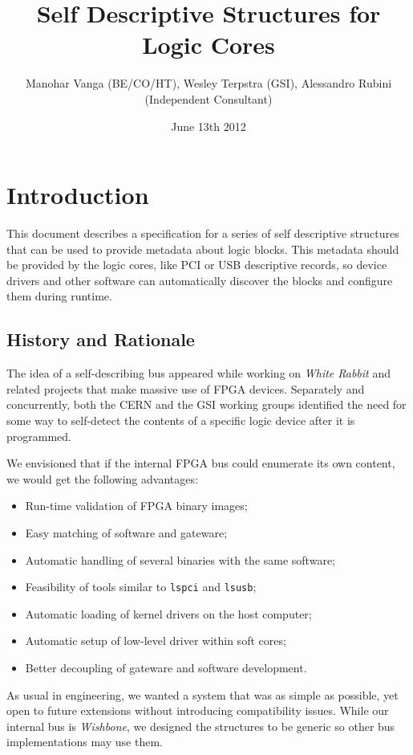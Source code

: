\documentclass[a4paper, 12pt]{article}
\title{Self Descriptive Structures for Logic Cores}
\author{Manohar Vanga (BE/CO/HT), Wesley Terpstra (GSI), Alessandro Rubini (Independent Consultant)}
\date{June 13th 2012}
\begin{document}
\maketitle

\tableofcontents
\listoftables
\listoffigures

\pagebreak

\section{Introduction}

This document describes a specification for a series of self descriptive
structures that can be used to provide metadata about logic blocks. This metadata
should be provided by the logic cores, like PCI or USB descriptive records,
so device drivers and other software can automatically discover the blocks and
configure them during runtime.

\subsection{History and Rationale}

The idea of a self-describing bus appeared while working on
\textit{White Rabbit} and related projects that make massive use of
FPGA devices. Separately and concurrently, both the CERN and the GSI
working groups identified the need for some way to self-detect the
contents of a specific logic device after it is programmed.

We envisioned that if the internal FPGA bus could enumerate its own
content, we would get the following advantages:

\begin{itemize}
\item Run-time validation of FPGA binary images;
\item Easy matching of software and gateware;
\item Automatic handling of several binaries with the same software;
\item Feasibility of tools similar to \texttt{lspci} and \texttt{lsusb};
\item Automatic loading of kernel drivers on the host computer;
\item Automatic setup of low-level driver within soft cores;
\item Better decoupling of gateware and software development.
\end{itemize}

As usual in engineering, we wanted a system that was as simple as possible,
yet open to future extensions without introducing compatibility issues.
While our internal bus is \textit{Wishbone}, we designed the structures
to be generic so other bus implementations may use them. 
\end{document}
